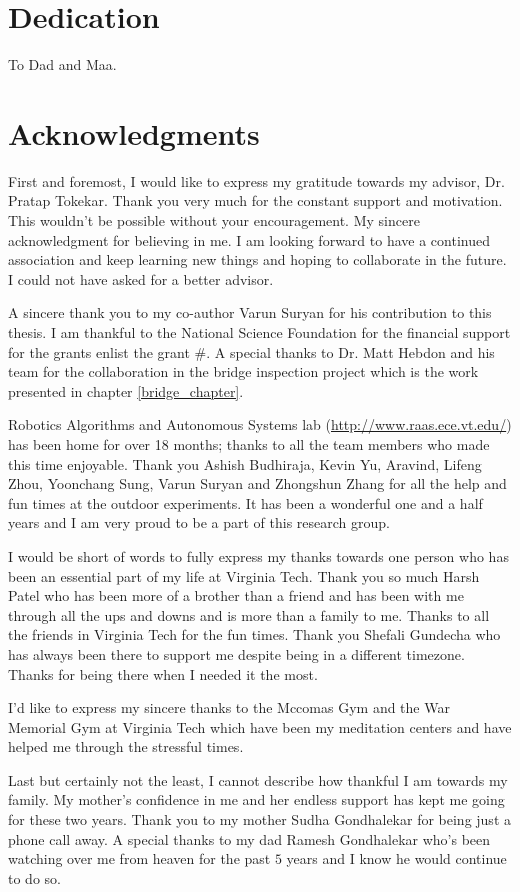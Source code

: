\documentclass[12pt]{report}
\begin{document}
\pagebreak

\chapter*{Dedication}
To Dad and Maa. 
\chapter*{Acknowledgments}
First and foremost, I would like to express my gratitude towards my advisor, Dr. Pratap Tokekar. Thank you very much for the constant support and motivation. This wouldn't be possible without your encouragement. My sincere acknowledgment for believing in me. I am looking forward to have a continued association and keep learning new things and hoping to collaborate in the future. I could not have asked for a better advisor. \par 
A sincere thank you to my co-author Varun Suryan for his contribution to this thesis. I am thankful to the National Science Foundation for the financial support for the grants {\color{red}enlist the grant \#}. A special thanks to Dr. Matt Hebdon and his team for the collaboration in the bridge inspection project which is the work presented in chapter \ref{bridge_chapter}.\par
Robotics Algorithms and Autonomous Systems lab (\url{http://www.raas.ece.vt.edu/}) has been home for over 18 months; thanks to all the team members who made this time enjoyable. Thank you Ashish Budhiraja, Kevin Yu, Aravind, Lifeng Zhou, Yoonchang Sung, Varun Suryan and Zhongshun Zhang for all the help and fun times at the outdoor experiments. It has been a wonderful one and a half years and I am very proud to be a part of this research group. \par 
I would be short of words to fully express my thanks towards one person who has been an essential part of my life at Virginia Tech. Thank you so much Harsh Patel who has been more of a brother than a friend and has been with me through all the ups and downs and is more than a family to me. Thanks to all the friends in Virginia Tech for the fun times.  Thank you Shefali Gundecha who has always been there to support me despite being in a different timezone. Thanks for being there when I needed it the most.\par 
I'd like to express my sincere thanks to the Mccomas Gym and the War Memorial Gym at Virginia Tech which have been my meditation centers and have helped me through the stressful times.\par 
Last but certainly not the least, I cannot describe how thankful I am towards my family. My mother's confidence in me and her endless support has kept me going for these two years. Thank you to my mother Sudha Gondhalekar for being just a phone call away. A special thanks to my dad Ramesh Gondhalekar who's been watching over me from heaven for the past $5$ years and I know he would continue to do so. 
\end{document}
